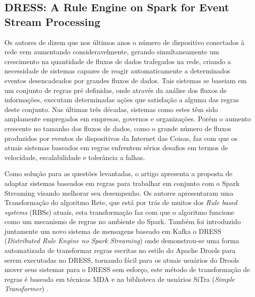\documentclass[ti,table]{texufpel} %
\begin{document}
  

  

\subsection{DRESS: A Rule Engine on Spark for Event Stream Processing} 

  

  

    Os autores de \cite{art5chen2016dress} dizem que nos últimos anos o número de dispositivo conectados à rede vem aumentando consideravelmente, gerando simultaneamente um crescimento na quantidade de fluxos de dados trafegados na rede, criando a necessidade de sistemas capazes de reagir automaticamente a determinados eventos desencadeados por grandes fluxos de dados. Tais sistemas se baseiam em um conjunto de regras pré definidas, onde através da análise dos fluxos de informações, executam determinadas ações que satisfação a alguma das regras deste conjunto. Nas últimas três décadas, sistemas como estes têm sido amplamente empregados em empresas, governos e organizações. Porém o aumento crescente no tamanho dos fluxos de dados, como o grande número de fluxos produzidos por eventos de dispositivos da Internet das Coisas, faz com que os atuais sistemas baseados em regras enfrentem sérios desafios em termos de velocidade, escalabilidade e tolerância a falhas. 

     

    Como solução para as questões levantadas, o artigo apresenta a proposta de adaptar sistemas baseados em regras para trabalhar em conjunto com o Spark Streaming visando melhorar seu desempenho. Os autores apresentaram uma Transformação do algoritmo Rete, que está por trás de muitos dos \textit{Rule based systems} (RBSs) atuais, esta transformação faz com que o algoritmo funcione como um mecanismo de regras no ambiente do Spark. Também foi introduzido juntamente um novo sistema de mensagens baseado em Kafka o DRESS (\textit{Distributed Rule Engine no Spark Streaming}) onde demonstrou-se uma forma automatizada de transformar regras escritas no estilo do Apache Drools para serem executadas no DRESS, tornando fácil para os atuais usuários do Drools mover seus sistemas para o DRESS sem esforço, este método de transformação de regras é baseada em técnicas MDA e na biblioteca de usuários SiTra (\textit{Simple Transformer})  \cite{art5chen2016dress} . 

     
\end{document}
